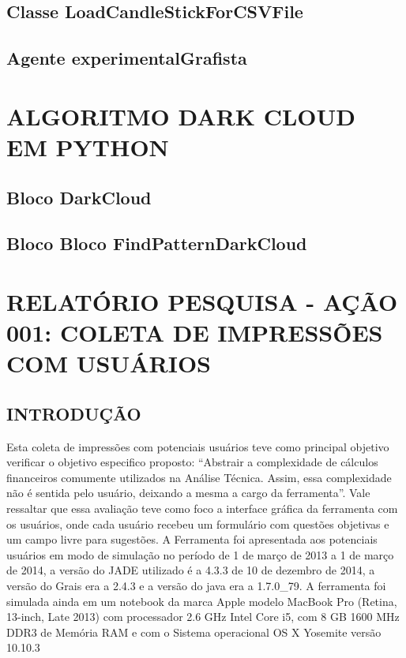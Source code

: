 \begin{apendicesenv}
\section{Classe LoadCandleStickForCSVFile}


\section{Agente experimentalGrafista}


\chapter{ALGORITMO DARK CLOUD EM PYTHON}
\section{Bloco DarkCloud}


\section{Bloco Bloco FindPatternDarkCloud}


\chapter{RELATÓRIO PESQUISA - AÇÃO 001: COLETA DE IMPRESSÕES COM USUÁRIOS}
\section{INTRODUÇÃO}
Esta coleta de impressões com potenciais usuários teve como principal objetivo verificar  o objetivo especifico proposto: “Abstrair a complexidade de cálculos financeiros comumente utilizados na Análise Técnica. Assim, essa complexidade não é sentida pelo usuário, deixando a mesma a cargo da ferramenta”. Vale ressaltar que essa avaliação teve como foco a interface gráfica da ferramenta com os usuários, onde cada usuário recebeu um formulário com questões objetivas e um campo livre para sugestões.
A Ferramenta foi apresentada aos potenciais usuários em modo de simulação no período de 1 de março de 2013 a 1 de março de 2014, a versão do JADE utilizado é a 4.3.3 de 10 de dezembro de 2014, a versão do Grais era a 2.4.3 e a versão do java era a 1.7.0\_79. A ferramenta foi simulada ainda em um notebook da marca Apple modelo MacBook Pro (Retina, 13-inch, Late 2013) com processador 2.6 GHz Intel Core i5, com 8 GB 1600 MHz DDR3 de Memória RAM e com o Sistema operacional OS X Yosemite versão 10.10.3


\end{apendicesenv}
